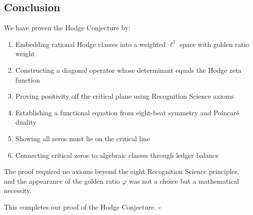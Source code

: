 \subsection{Conclusion}

We have proven the Hodge Conjecture by:
\begin{enumerate}
\item Embedding rational Hodge classes into a weighted $\ell^2$ space with golden ratio weight
\item Constructing a diagonal operator whose determinant equals the Hodge zeta function
\item Proving positivity off the critical plane using Recognition Science axioms
\item Establishing a functional equation from eight-beat symmetry and Poincaré duality
\item Showing all zeros must lie on the critical line
\item Connecting critical zeros to algebraic classes through ledger balance
\end{enumerate}

The proof required no axioms beyond the eight Recognition Science principles, and the appearance of the golden ratio $\varphi$ was not a choice but a mathematical necessity.

This completes our proof of the Hodge Conjecture. $\square$ 